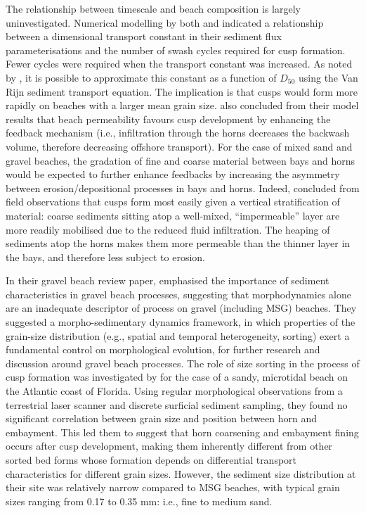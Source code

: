 The relationship between timescale and beach composition is largely uninvestigated. Numerical modelling by both \citet{Coco_etal2000} and \citet{Dodd_etal2008} indicated a relationship between a dimensional transport constant in their sediment flux parameterisations and the number of swash cycles required for cusp formation. Fewer cycles were required when the transport constant was increased. As noted by \citet{Dodd_etal2008}, it is possible to approximate this constant as a function of $D_{50}$ using the Van Rijn sediment transport equation. The implication is that cusps would form more rapidly on beaches with a larger mean grain size. \citet{Dodd_etal2008} also concluded from their model results that beach permeability favours cusp development by enhancing the feedback mechanism (i.e., infiltration through the horns decreases the backwash volume, therefore decreasing offshore transport). For the case of mixed sand and gravel beaches, the gradation of fine and coarse material between bays and horns would be expected to further enhance feedbacks by increasing the asymmetry between erosion/depositional processes in bays and horns. Indeed, \citet{LonguetHiggins_Parkin1962} concluded from field observations that cusps form most easily given a vertical stratification of material: coarse sediments sitting atop a well-mixed, ``impermeable'' layer are more readily mobilised due to the reduced fluid infiltration. The heaping of sediments atop the horns makes them more permeable than the thinner layer in the bays, and therefore less subject to erosion. 
 
In their gravel beach review paper, \citet{Buscombe_Masselink2006} emphasised the importance of sediment characteristics in gravel beach processes, suggesting that morphodynamics alone are an inadequate descriptor of process on gravel (including MSG) beaches. They suggested a morpho-sedimentary dynamics framework, in which properties of the grain-size distribution (e.g., spatial and temporal heterogeneity, sorting) exert a fundamental control on morphological evolution, for further research and discussion around gravel beach processes. The role of size sorting in the process of cusp formation was investigated by \citet{VanGaalen_etal2011} for the case of a sandy, microtidal beach on the Atlantic coast of Florida. Using regular morphological observations from a terrestrial laser scanner and discrete surficial sediment sampling, they found no significant correlation between grain size and position between horn and embayment. This led them to suggest that horn coarsening and embayment fining occurs after cusp development, making them inherently different from other sorted bed forms whose formation depends on differential transport characteristics for different grain sizes. However, the sediment size distribution at their site was relatively narrow compared to MSG beaches, with typical grain sizes ranging from 0.17 to 0.35 mm: i.e., fine to medium sand. 

